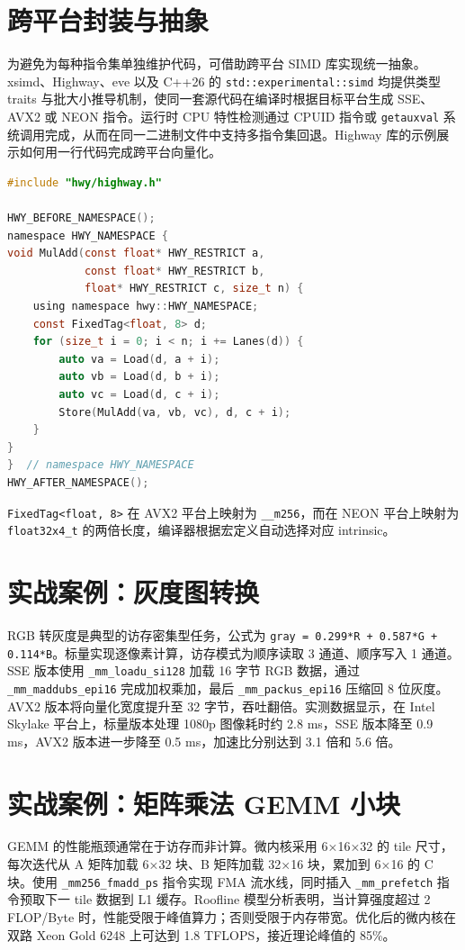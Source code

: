 \chapter{跨平台封装与抽象}
为避免为每种指令集单独维护代码，可借助跨平台 SIMD 库实现统一抽象。xsimd、Highway、eve 以及 C++26 的 \texttt{std::experimental::simd} 均提供类型 traits 与批大小推导机制，使同一套源代码在编译时根据目标平台生成 SSE、AVX2 或 NEON 指令。运行时 CPU 特性检测通过 CPUID 指令或 \texttt{getauxval} 系统调用完成，从而在同一二进制文件中支持多指令集回退。Highway 库的示例展示如何用一行代码完成跨平台向量化。\par
\begin{lstlisting}[language=c]
#include "hwy/highway.h"

HWY_BEFORE_NAMESPACE();
namespace HWY_NAMESPACE {
void MulAdd(const float* HWY_RESTRICT a,
            const float* HWY_RESTRICT b,
            float* HWY_RESTRICT c, size_t n) {
    using namespace hwy::HWY_NAMESPACE;
    const FixedTag<float, 8> d;
    for (size_t i = 0; i < n; i += Lanes(d)) {
        auto va = Load(d, a + i);
        auto vb = Load(d, b + i);
        auto vc = Load(d, c + i);
        Store(MulAdd(va, vb, vc), d, c + i);
    }
}
}  // namespace HWY_NAMESPACE
HWY_AFTER_NAMESPACE();
\end{lstlisting}
\texttt{FixedTag<float, 8>} 在 AVX2 平台上映射为 \texttt{\_{}\_{}m256}，而在 NEON 平台上映射为 \texttt{float32x4\_{}t} 的两倍长度，编译器根据宏定义自动选择对应 intrinsic。\par
\chapter{实战案例：灰度图转换}
RGB 转灰度是典型的访存密集型任务，公式为 \texttt{gray = 0.299*R + 0.587*G + 0.114*B}。标量实现逐像素计算，访存模式为顺序读取 3 通道、顺序写入 1 通道。SSE 版本使用 \texttt{\_{}mm\_{}loadu\_{}si128} 加载 16 字节 RGB 数据，通过 \texttt{\_{}mm\_{}maddubs\_{}epi16} 完成加权乘加，最后 \texttt{\_{}mm\_{}packus\_{}epi16} 压缩回 8 位灰度。AVX2 版本将向量化宽度提升至 32 字节，吞吐翻倍。实测数据显示，在 Intel Skylake 平台上，标量版本处理 1080p 图像耗时约 2.8 ms，SSE 版本降至 0.9 ms，AVX2 版本进一步降至 0.5 ms，加速比分别达到 3.1 倍和 5.6 倍。\par
\chapter{实战案例：矩阵乘法 GEMM 小块}
GEMM 的性能瓶颈通常在于访存而非计算。微内核采用 6×16×32 的 tile 尺寸，每次迭代从 A 矩阵加载 6×32 块、B 矩阵加载 32×16 块，累加到 6×16 的 C 块。使用 \texttt{\_{}mm256\_{}fmadd\_{}ps} 指令实现 FMA 流水线，同时插入 \texttt{\_{}mm\_{}prefetch} 指令预取下一 tile 数据到 L1 缓存。Roofline 模型分析表明，当计算强度超过 2 FLOP/Byte 时，性能受限于峰值算力；否则受限于内存带宽。优化后的微内核在双路 Xeon Gold 6248 上可达到 1.8 TFLOPS，接近理论峰值的 85\%{}。\par
